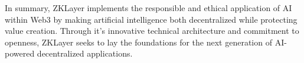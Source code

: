 \documentclass[conference]{IEEEtran}
\begin{document}
In summary, ZKLayer implements the responsible and ethical application of AI within Web3 by making artiﬁcial intelligence both decentralized while protecting value creation. Through it’s innovative technical architecture and commitment to openness, ZKLayer seeks to lay the foundations for the next generation of AI-powered decentralized applications.



\clearpage







\end{document}
